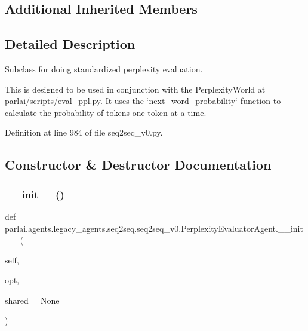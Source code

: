\subsection*{Additional Inherited Members}


\subsection{Detailed Description}
\begin{DoxyVerb}Subclass for doing standardized perplexity evaluation.

This is designed to be used in conjunction with the PerplexityWorld at
parlai/scripts/eval_ppl.py. It uses the `next_word_probability` function to
calculate the probability of tokens one token at a time.
\end{DoxyVerb}
 

Definition at line 984 of file seq2seq\+\_\+v0.\+py.



\subsection{Constructor \& Destructor Documentation}
\mbox{\label{classparlai_1_1agents_1_1legacy__agents_1_1seq2seq_1_1seq2seq__v0_1_1PerplexityEvaluatorAgent_a6d6f4af5d475bea076503cd83c5ce502}} 
\subsubsection{\texorpdfstring{\+\_\+\+\_\+init\+\_\+\+\_\+()}{\_\_init\_\_()}}
{\footnotesize\ttfamily def parlai.\+agents.\+legacy\+\_\+agents.\+seq2seq.\+seq2seq\+\_\+v0.\+Perplexity\+Evaluator\+Agent.\+\_\+\+\_\+init\+\_\+\+\_\+ (\begin{DoxyParamCaption}\item[{}]{self,  }\item[{}]{opt,  }\item[{}]{shared = {\ttfamily None} }\end{DoxyParamCaption})}



